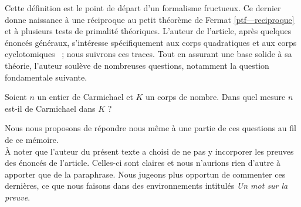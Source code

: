 Cette définition est le point de départ d'un formalisme fructueux. Ce dernier donne naissance à une réciproque au petit théorème de Fermat \ref{ptf—reciproque} et à plusieurs tests de primalité théoriques. L'auteur de l'article, après quelques énoncés généraux, s'intéresse spécifiquement aux corps quadratiques et aux corps cyclotomiques ~; nous suivrons ces traces. Tout en assurant une base solide à sa théorie, l'auteur soulève de nombreuses questions, notamment la question fondamentale suivante.

\begin{question}\label{question-centrale}Soient $n$ un entier de Carmichael et $K$ un corps de nombre. Dans quel mesure $n$ est-il de Carmichael dans $K$ ?
\end{question}

\noindent Nous nous proposons de répondre nous même à une partie de ces questions au fil de ce mémoire. \\

À noter que l'auteur du présent texte a choisi de ne pas y incorporer les preuves des énoncés de l'article. Celles-ci sont claires et nous n'aurions rien d'autre à apporter que de la paraphrase. Nous jugeons plus opportun de commenter ces dernières, ce que nous faisons dans des environnements intitulés \textit{Un mot sur la preuve}.
